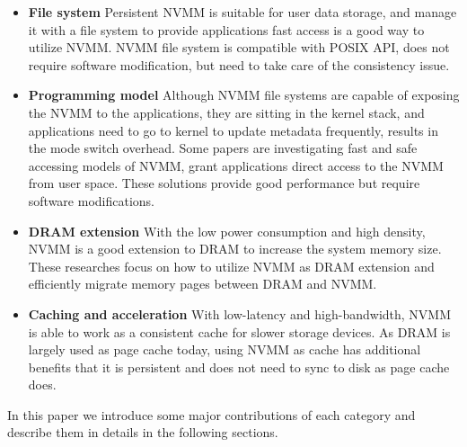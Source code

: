 \begin{itemize}
\item \textbf{File system} Persistent  NVMM is suitable for
user data storage, and manage it with a file system to provide applications
fast access is a good way to utilize NVMM. NVMM file system is compatible
with POSIX API, does not require software modification, but need to take care
of the consistency issue.

\item \textbf{Programming model} Although NVMM file systems are capable
 of exposing the NVMM to the applications, they are sitting in the kernel stack,
and applications need to go to kernel to update metadata frequently, results in
the mode switch overhead.
Some papers are investigating fast and safe accessing models of
NVMM, grant applications direct access to the NVMM from user space. 
These solutions provide good performance but require software modifications.

\item \textbf{DRAM extension} With the low power consumption and high density,
NVMM is a good extension to DRAM to increase the system memory size. These
researches focus on how to utilize NVMM as DRAM extension and efficiently
migrate memory pages between DRAM and NVMM.

\item \textbf{Caching and acceleration} With low-latency and high-bandwidth,
NVMM is able to work as a consistent cache for slower storage devices. As
DRAM is largely used as page cache today, using NVMM as cache has additional
benefits that it is persistent and does not need to sync to disk as page cache
does.

\end{itemize}  

In this paper we introduce some major contributions of each category
and describe them in details in the following sections.

